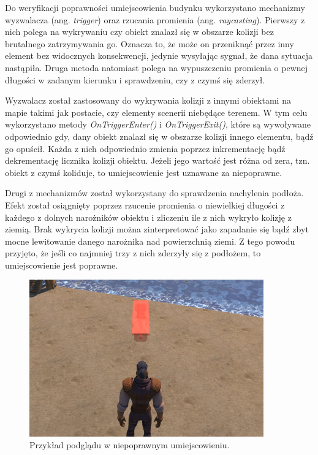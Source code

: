 Do weryfikacji poprawności umiejscowienia budynku wykorzystano mechanizmy wyzwalacza (ang. \textit{trigger}) oraz rzucania
promienia (ang. \textit{raycasting}). Pierwszy z nich polega na wykrywaniu czy obiekt znalazł się w obszarze kolizji bez
brutalnego zatrzymywania go. Oznacza to, że może on przeniknąć przez inny element bez widocznych konsekwencji, jedynie
wysyłając sygnał, że dana sytuacja nastąpiła. Druga metoda natomiast polega na wypuszczeniu promienia o pewnej długości
w zadanym kierunku i sprawdzeniu, czy z czymś się zderzył.

Wyzwalacz został zastosowany do wykrywania kolizji z innymi obiektami na mapie takimi jak postacie, czy elementy
scenerii niebędące terenem. W tym celu wykorzystano metody \textit{OnTriggerEnter()} i \textit{OnTriggerExit()}, które są wywoływane
odpowiednio gdy, dany obiekt znalazł się w obszarze kolizji innego elementu, bądź go opuścił. Każda z nich odpowiednio
zmienia poprzez inkrementację bądź dekrementację licznika kolizji obiektu. Jeżeli jego wartość jest różna od zera, tzn.
obiekt z czymś koliduje, to umiejscowienie jest uznawane za niepoprawne.

Drugi z mechanizmów został wykorzystany do sprawdzenia nachylenia podłoża. Efekt został osiągnięty poprzez rzucenie
promienia o niewielkiej długości z każdego z dolnych narożników obiektu i zliczeniu ile z nich wykryło kolizję z ziemią.
Brak wykrycia kolizji można zinterpretować jako zapadanie się bądź zbyt mocne lewitowanie danego narożnika nad
powierzchnią ziemi. Z tego powodu przyjęto, że jeśli co najmniej trzy z nich zderzyły się z podłożem, to umiejscowienie
jest poprawne.

\begin{figure}[h!]
    \centering
    \includegraphics[width=0.9\textwidth]{images/implementacja/mechanizm_budowania/niepoprawne.png}
    \caption{Przykład podglądu w niepoprawnym umiejscowieniu.}
\end{figure}

